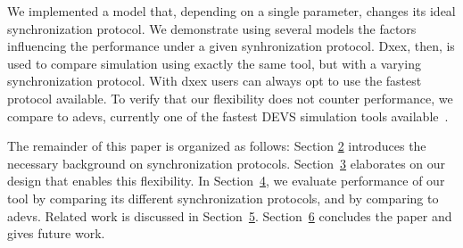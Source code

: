 We implemented a model that, depending on a single parameter, changes its ideal synchronization protocol. We demonstrate using several models the factors influencing the performance under a given synhronization protocol.
Dxex, then, is used to compare simulation using exactly the same tool, but with a varying synchronization protocol. With dxex users can always opt to use the fastest protocol available.
To verify that our flexibility does not counter performance, we compare to adevs, currently one of the fastest \textsf{DEVS} simulation tools available~\cite{PythonPDEVS,DEVSSurvey}.


The remainder of this paper is organized as follows:
Section \hyperref[sec:2-background]{2} introduces the necessary background on synchronization protocols.
Section~\hyperref[sec:3-features]{3} elaborates on our design that enables this flexibility.
In Section~\hyperref[sec:4-performance]{4}, we evaluate performance of our tool by comparing its different synchronization protocols, and by comparing to adevs.
Related work is discussed in Section~\hyperref[sec:5-related-work]{5}.
Section~\hyperref[sec:6-conclusion]{6} concludes the paper and gives future work.
